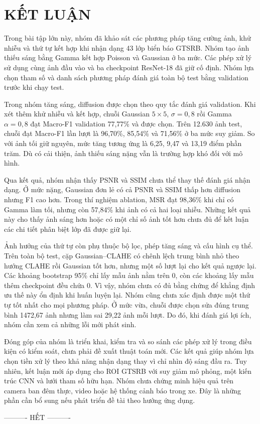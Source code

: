\section{KẾT LUẬN}
Trong bài tập lớn này, nhóm đã khảo sát các phương pháp tăng cường ảnh, khử nhiễu và thứ tự kết hợp khi nhận dạng 43 lớp biển báo GTSRB. Nhóm tạo ảnh thiếu sáng bằng Gamma kết hợp Poisson và Gaussian ở ba mức. Các phép xử lý sử dụng cùng ảnh đầu vào và ba checkpoint ResNet-18 đã giữ cố định. Nhóm lựa chọn tham số và danh sách phương pháp đánh giá toàn bộ test bằng validation trước khi chạy test.

Trong nhóm tăng sáng, diffusion được chọn theo quy tắc đánh giá validation. Khi xét thêm khử nhiễu và kết hợp, chuỗi Gaussian $5\times5$, $\sigma=0,8$ rồi Gamma $\alpha=0,8$ đạt Macro-F1 validation 77,77\% và được chọn. Trên 12.630 ảnh test, chuỗi đạt Macro-F1 lần lượt là 96,70\%, 85,54\% và 71,56\% ở ba mức suy giảm. So với ảnh tối giữ nguyên, mức tăng tương ứng là 6,25, 9,47 và 13,19 điểm phần trăm. Dù có cải thiện, ảnh thiếu sáng nặng vẫn là trường hợp khó đối với mô hình.

Qua kết quả, nhóm nhận thấy PSNR và SSIM chưa thể thay thế đánh giá nhận dạng. Ở mức nặng, Gaussian đơn lẻ có cả PSNR và SSIM thấp hơn diffusion nhưng F1 cao hơn. Trong thí nghiệm ablation, MSR đạt 98,36\% khi chỉ có Gamma làm tối, nhưng còn 57,84\% khi ảnh có cả hai loại nhiễu. Những kết quả này cho thấy ảnh sáng hơn hoặc có một chỉ số ảnh tốt hơn chưa đủ để kết luận các chi tiết phân biệt lớp đã được giữ lại.

Ảnh hưởng của thứ tự còn phụ thuộc bộ lọc, phép tăng sáng và cấu hình cụ thể. Trên toàn bộ test, cặp Gaussian--CLAHE có chênh lệch trung bình nhỏ theo hướng CLAHE rồi Gaussian tốt hơn, nhưng một số lượt lại cho kết quả ngược lại. Các khoảng bootstrap 95\% chỉ lấy mẫu ảnh nằm trên 0, còn các khoảng lấy mẫu thêm checkpoint đều chứa 0. Vì vậy, nhóm chưa có đủ bằng chứng để khẳng định ưu thế này ổn định khi huấn luyện lại. Nhóm cũng chưa xác định được một thứ tự tốt nhất cho mọi phương pháp. Ở mức vừa, chuỗi được chọn sửa đúng trung bình 1472,67 ảnh nhưng làm sai 29,22 ảnh mỗi lượt. Do đó, khi đánh giá lợi ích, nhóm cần xem cả những lỗi mới phát sinh.

Đóng góp của nhóm là triển khai, kiểm tra và so sánh các phép xử lý trong điều kiện có kiểm soát, chưa phải đề xuất thuật toán mới. Các kết quả giúp nhóm lựa chọn tiền xử lý theo khả năng nhận dạng thay vì chỉ nhìn độ sáng đầu ra. Tuy nhiên, kết luận mới áp dụng cho ROI GTSRB với suy giảm mô phỏng, một kiến trúc CNN và lưới tham số hữu hạn. Nhóm chưa chứng minh hiệu quả trên camera ban đêm thực, video hoặc hệ thống cảnh báo trong xe. Đây là những phần cần bổ sung nếu phát triển đề tài theo hướng ứng dụng.
\begin{center}\vspace{6mm}---------- HẾT ----------\end{center}
